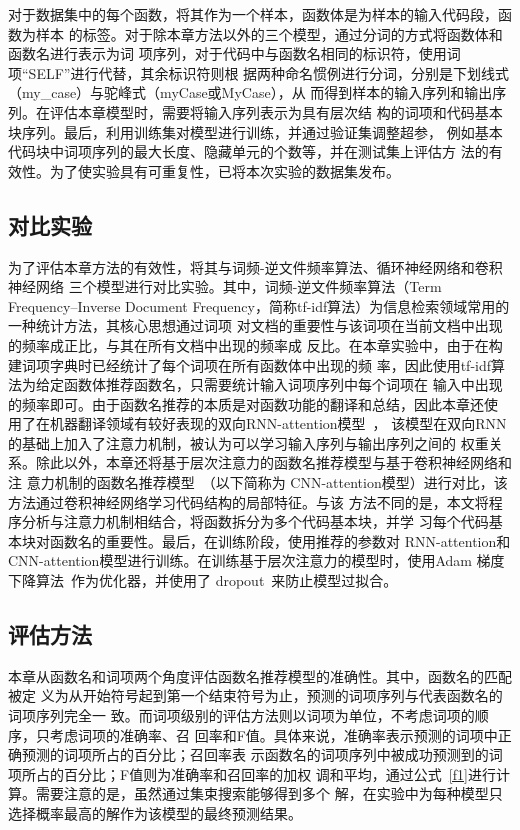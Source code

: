 对于数据集中的每个函数，将其作为一个样本，函数体是为样本的输入代码段，函数为样本
的标签。对于除本章方法以外的三个模型，通过分词的方式将函数体和函数名进行表示为词
项序列，对于代码中与函数名相同的标识符，使用词项``SELF''进行代替，其余标识符则根
据两种命名惯例进行分词，分别是下划线式（my\_case）与驼峰式（myCase或MyCase），从
而得到样本的输入序列和输出序列。在评估本章模型时，需要将输入序列表示为具有层次结
构的词项和代码基本块序列。最后，利用训练集对模型进行训练，并通过验证集调整超参，
例如基本代码块中词项序列的最大长度、隐藏单元的个数等，并在测试集上评估方
法的有效性。为了使实验具有可重复性，已将本次实验的数据集发布。

\subsection{对比实验}
为了评估本章方法的有效性，将其与词频-逆文件频率算法、循环神经网络和卷积神经网络
三个模型进行对比实验。其中，词频-逆文件频率算法（Term Frequency–Inverse Document
Frequency，简称tf-idf算法）为信息检索领域常用的一种统计方法，其核心思想通过词项
对文档的重要性与该词项在当前文档中出现的频率成正比，与其在所有文档中出现的频率成
反比。在本章实验中，由于在构建词项字典时已经统计了每个词项在所有函数体中出现的频
率，因此使用tf-idf算法为给定函数体推荐函数名，只需要统计输入词项序列中每个词项在
输入中出现的频率即可。由于函数名推荐的本质是对函数功能的翻译和总结，因此本章还使
用了在机器翻译领域有较好表现的双向RNN-attention模型~\cite{bahdanau2015neural}，
该模型在双向RNN的基础上加入了注意力机制，被认为可以学习输入序列与输出序列之间的
权重关系。除此以外，本章还将基于层次注意力的函数名推荐模型与基于卷积神经网络和注
意力机制的函数名推荐模型~\cite{allamanis2016convolutional}（以下简称为
CNN-attention模型）进行对比，该方法通过卷积神经网络学习代码结构的局部特征。与该
方法不同的是，本文将程序分析与注意力机制相结合，将函数拆分为多个代码基本块，并学
习每个代码基本块对函数名的重要性。最后，在训练阶段，使用推荐的参数对
RNN-attention和CNN-attention模型进行训练。在训练基于层次注意力的模型时，使用Adam
梯度下降算法~\cite{kingma2014adam}作为优化器，并使用了
dropout~\cite{srivastava2014dropout}来防止模型过拟合。

\subsection{评估方法}
本章从函数名和词项两个角度评估函数名推荐模型的准确性。其中，函数名的匹配被定
义为从开始符号起到第一个结束符号为止，预测的词项序列与代表函数名的词项序列完全一
致。而词项级别的评估方法则以词项为单位，不考虑词项的顺序，只考虑词项的准确率、召
回率和F值。具体来说，准确率表示预测的词项中正确预测的词项所占的百分比；召回率表
示函数名的词项序列中被成功预测到的词项所占的百分比；F值则为准确率和召回率的加权
调和平均，通过公式~\ref{f1}进行计算。需要注意的是，虽然通过集束搜索能够得到多个
解，在实验中为每种模型只选择概率最高的解作为该模型的最终预测结果。

